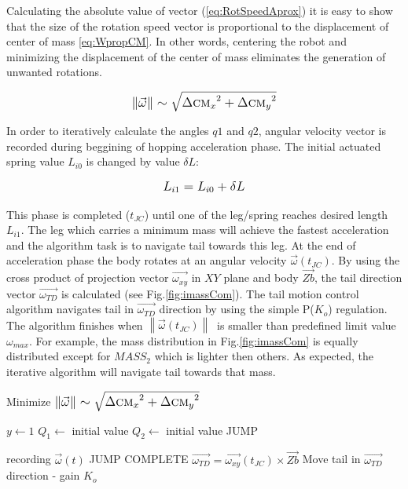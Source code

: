Calculating the absolute value of vector (\ref{eq:RotSpeedAprox}) it is easy to show that the size of the rotation speed vector is proportional to the displacement of center of mass \eqref{eq:WpropCM}. In other words, centering the robot and minimizing the displacement of the center of mass eliminates the generation of unwanted rotations. 

\begin{equation}\label{eq:WpropCM}
\left \| \vec{\omega} \right \|\sim \sqrt{{\Delta \textsc{cm}_x}^2+{\Delta \textsc{cm}_y}^2}
\end{equation}


In order to iteratively calculate the angles $q1$ and $q2$, angular velocity vector is recorded during beggining of hopping acceleration phase. The initial actuated spring value $L_{i0}$ is changed by value $\delta L$:

\begin{equation}
\tiny
L_{i1}=L_{i0}+\delta L
\normalsize
\end{equation}  

This phase is completed ($t_{JC}$) until one of the leg/spring reaches desired length $L_{i1}$. The leg which carries a minimum mass will achieve the fastest acceleration and the algorithm task is to navigate tail towards this leg. At the end of acceleration phase the body rotates at an angular velocity $\vec{\omega}(t_{JC})$. By using the cross product of projection vector $\vec{\omega_{xy}}$ in $XY$ plane and body $\vec{Zb}$, the tail direction vector $\vec{\omega_{TD}}$ is calculated (see Fig.\ref{fig:imassCom}). The tail motion control algorithm navigates tail in $\vec{\omega_{TD}}$ direction by using the simple P($K_o$) regulation. The algorithm finishes when $\left \| \vec{\omega}(t_{JC}) \right \|\ $ is smaller than predefined limit value $\omega_{max}$.  For example, the mass distribution in Fig.\ref{fig:imassCom} is equally distributed except for $MASS_2$  which is lighter then others. As expected, the iterative algorithm will navigate tail towards that mass.



\begin{algorithm}
\caption{Minimize $\left \| \vec{\omega} \right \|\sim \sqrt{{\Delta \textsc{cm}_x}^2+{\Delta \textsc{cm}_y}^2}$}
\begin{algorithmic} 
\STATE $y \leftarrow 1$
\REPEAT
\STATE $Q_1 \leftarrow$ initial value
\STATE $Q_2 \leftarrow$ initial value
\STATE JUMP

\REPEAT
\STATE recording $\vec{\omega}(t)$
\UNTIL JUMP COMPLETE
\STATE $\vec{\omega_{TD}} = \vec{\omega_{xy}}(t_{JC}) \times \vec{Zb}$
\STATE Move tail in $\vec{\omega_{TD}}$ direction - gain $K_o$
\end{algorithmic}
\end{algorithm}


